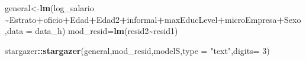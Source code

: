 \documentclass[
]{article}
\newenvironment{Shaded}{\begin{snugshade}}{\end{snugshade}}
\newcommand{\AttributeTok}[1]{\textcolor[rgb]{0.13,0.29,0.53}{#1}}
\newcommand{\DecValTok}[1]{\textcolor[rgb]{0.00,0.00,0.81}{#1}}
\newcommand{\FunctionTok}[1]{\textcolor[rgb]{0.13,0.29,0.53}{\textbf{#1}}}
\newcommand{\NormalTok}[1]{#1}
\newcommand{\OtherTok}[1]{\textcolor[rgb]{0.56,0.35,0.01}{#1}}
\newcommand{\SpecialCharTok}[1]{\textcolor[rgb]{0.81,0.36,0.00}{\textbf{#1}}}
\newcommand{\StringTok}[1]{\textcolor[rgb]{0.31,0.60,0.02}{#1}}
\begin{document}
\begin{Shaded}
\begin{Highlighting}[]
\NormalTok{general}\OtherTok{\textless{}{-}}\FunctionTok{lm}\NormalTok{(log\_salario }\SpecialCharTok{\textasciitilde{}}\NormalTok{Estrato}\SpecialCharTok{+}\NormalTok{oficio}\SpecialCharTok{+}\NormalTok{Edad}\SpecialCharTok{+}\NormalTok{Edad2}\SpecialCharTok{+}\NormalTok{informal}\SpecialCharTok{+}\NormalTok{maxEducLevel}\SpecialCharTok{+}\NormalTok{microEmpresa}\SpecialCharTok{+}\NormalTok{Sexo,}\AttributeTok{data =}\NormalTok{ data\_h)}
\NormalTok{mod\_resid}\OtherTok{=}\FunctionTok{lm}\NormalTok{(resid2}\SpecialCharTok{\textasciitilde{}}\NormalTok{resid1)}
\end{Highlighting}
\end{Shaded}

\begin{Shaded}
\begin{Highlighting}[]
\NormalTok{stargazer}\SpecialCharTok{::}\FunctionTok{stargazer}\NormalTok{(general,mod\_resid,modelS,}\AttributeTok{type =} \StringTok{"text"}\NormalTok{,}\AttributeTok{digits=} \DecValTok{3}\NormalTok{)}
\end{Highlighting}
\end{Shaded}
\end{document}
